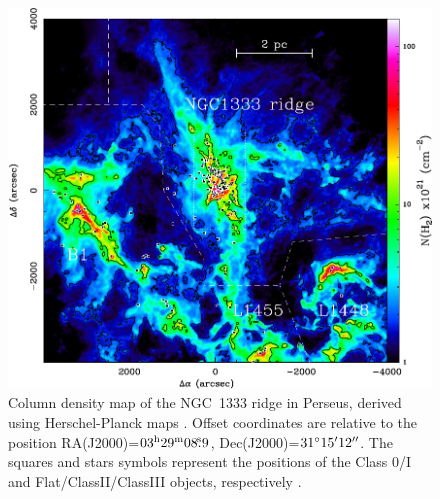 \documentclass[12pt]{mythesis}
\begin{document}
\begin{figure}[h!]
	\begin{center}
		\includegraphics[width=\textwidth]{figures/NGC1333ridge.pdf}
		\caption[NGC~1333 ridge]{Column density map of the NGC~1333 ridge in Perseus, derived using Herschel-Planck maps \citep[taken from][]{hacar2017}. Offset coordinates are relative to the position RA(J2000)=$03^\mathrm{h}29^\mathrm{m}08\mbox{$.\!\!^{\mathrm s}$}9$, Dec(J2000)=$31^\circ15\mbox{$^\prime$}12\mbox{$^{\prime\prime}$}$. The squares and stars symbols represent the positions of the Class 0/I and Flat/ClassII/ClassIII objects, respectively \citep[for more information, see][]{hacar2017}.}
	\label{fig:NGC1333ridge}
	\end{center}
\end{figure}

\end{document}

